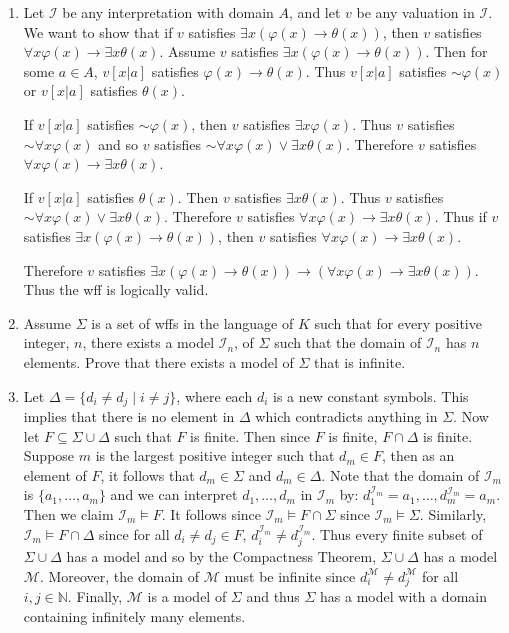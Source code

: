 \documentclass[12pt]{article}
\makeatletter
\theoremstyle{definition}
\theoremstyle{remark}
\renewenvironment{proof}[1][\proofname]{\par
  \pushQED{\qed}%
  \normalfont \topsep6\p@\@plus6\p@\relax
  \list{}{\leftmargin=0mm
          \rightmargin=4mm
          \settowidth{\itemindent}{\itshape#1}%
          \labelwidth=\itemindent
          \parsep=0pt \listparindent=\parindent 
  }
  \item[\hskip\labelsep
        \itshape
    #1\@addpunct{.}]\ignorespaces
}{%
  \popQED\endlist\@endpefalse
}
\let\oldproofname=\proofname
\renewcommand{\proofname}{\bf{\textit{\oldproofname}}}
\makeatother
\begin{document}
\begin{enumerate}[leftmargin=*]
\begin{proof}
                Let $\mathcal{I}$ be any interpretation with domain $A$, and let $v$ be any valuation in $\mathcal{I}$. We want to show that if $v$ satisfies $\exists x(\varphi(x)\rightarrow\theta(x))$, then $v$ satisfies $\forall x\varphi(x)\rightarrow\exists x\theta(x)$. Assume $v$ satisfies $\exists x(\varphi(x)\rightarrow\theta(x))$. Then for some $a\in A$, $v[x|a]$ satisfies $\varphi(x)\rightarrow\theta(x)$. Thus $v[x|a]$ satisfies $\sim\varphi(x)$ or $v[x|a]$ satisfies $\theta(x)$.\par\hspace{4mm} If $v[x|a]$ satisfies $\sim\varphi(x)$, then $v$ satisfies $\exists x\varphi(x)$. Thus $v$ satisfies $\sim\forall x\varphi(x)$ and so $v$ satisfies $\sim\forall x\varphi(x)\lor\exists x\theta(x)$. Therefore $v$ satisfies $\forall x\varphi(x)\rightarrow\exists x\theta(x)$.\par\hspace{4mm} If $v[x|a]$ satisfies $\theta(x)$. Then $v$ satisfies $\exists x\theta(x)$. Thus $v$ satisfies $\sim\forall x\varphi(x)\lor\exists x\theta(x)$. Therefore $v$ satisfies $\forall x\varphi(x)\rightarrow\exists x\theta(x)$. Thus if $v$ satisfies $\exists x(\varphi(x)\rightarrow\theta(x))$, then $v$ satisfies $\forall x\varphi(x)\rightarrow\exists x\theta(x)$.\par\hspace{4mm} Therefore $v$ satisfies $\exists x(\varphi(x)\rightarrow\theta(x))\rightarrow(\forall x\varphi(x)\rightarrow\exists x\theta(x))$. Thus the wff is logically valid.
            \end{proof}
        \item Assume $\Sigma$ is a set of wffs in the language of $K$ such that for every positive integer, $n$, there exists a model $\mathcal{I}_n$, of $\Sigma$ such that the domain of $\mathcal{I}_n$ has $n$ elements. Prove that there exists a model of $\Sigma$ that is infinite.
            \begin{proof}
                Let $\Delta=\{d_i\neq d_j\mid i\neq j\}$, where each $d_i$ is a new constant symbols. This implies that there is no element in $\Delta$ which contradicts anything in $\Sigma$. Now let $F\subseteq\Sigma\cup\Delta$ such that $F$ is finite. Then since $F$ is finite, $F\cap\Delta$ is finite. Suppose $m$ is the largest positive integer such that $d_m\in F$, then as an element of $F$, it follows that $d_m\in\Sigma$ and $d_m\in\Delta$. Note that the domain of $\mathcal{I}_m$ is $\{a_1,\dots,a_m\}$ and we can interpret $d_1,\dots,d_m$ in $\mathcal{I}_m$ by: $d_1^{\mathcal{I}_m}=a_1,\dots,d_m^{\mathcal{I}_m}=a_m$. Then we claim $\mathcal{I}_m\models F$. It follows since $\mathcal{I}_m\models F\cap\Sigma$ since $\mathcal{I}_m\models\Sigma$. Similarly, $\mathcal{I}_m\models F\cap\Delta$ since for all $d_i\neq d_j\in F$, $d_i^{\mathcal{I}_m}\neq d_j^{\mathcal{I}_m}$. Thus every finite subset of $\Sigma\cup\Delta$ has a model and so by the Compactness Theorem, $\Sigma\cup\Delta$ has a model $\mathcal{M}$. Moreover, the domain of $\mathcal{M}$ must be infinite since $d_i^{\mathcal{M}}\neq d_j^{\mathcal{M}}$ for all $i,j\in\mathbb{N}$. Finally, $\mathcal{M}$ is a model of $\Sigma$ and thus $\Sigma$ has a model with a domain containing infinitely many elements.

\end{proof}
\end{enumerate}
\end{document}
